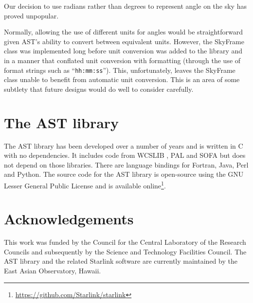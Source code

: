 \documentclass[final,authoryear,5p,times,twocolumn]{elsarticle}
\begin{document}
Our decision to use radians rather than degrees to represent angle on the
sky has proved unpopular.

Normally, allowing the use of different units for angles would be
straightforward given AST's ability to convert between equivalent units.
However, the SkyFrame class was implemented long before unit conversion
was added to the library and in a manner that conflated unit conversion
with formatting (through the use of format strings such as
``\texttt{hh:mm:ss}'').
This, unfortunately, leaves the SkyFrame class unable to benefit from
automatic unit conversion. This is an area of some subtlety that future
designs would do well to consider carefully.

\section{The AST library}

The AST library has been developed over a number of years
\citep{1998ASPC..145...41W,2000ASPC..216..506W,2001ASPC..238..129B,2004ASPC..314..412B,2008ASPC..394..635B,2010ASPC..434..213B,2012ASPC..461..825B}
  and is written in C with no dependencies. It includes code from
  WCSLIB \citep[][]{2006ASPC..351..591C}, PAL \citep{2013ASPC..475..307J}
  and SOFA \citep[][]{2011SchpJ...611404H} but does not depend on those
  libraries. There are language bindings for Fortran, Java, Perl and
  Python. The
source code for the AST library is open-source using the GNU Lesser General
Public License and is available
online\footnote{\url{https://github.com/Starlink/starlink}}.


\section{Acknowledgements}

This work was funded by the Council for the Central Laboratory of the
Research Councils and subsequently by the Science and Technology
Facilities Council.  The AST library and the related Starlink software
are currently maintained by the East Asian Observatory, Hawaii.
\end{document}

